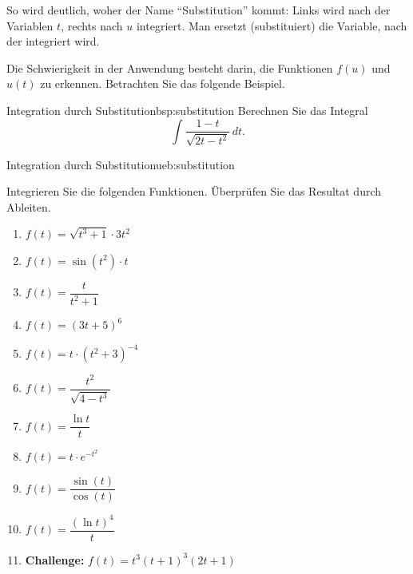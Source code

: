 So wird deutlich, woher der Name \enquote{Substitution} kommt:
Links wird nach der Variablen \(t\), rechts nach \(u\) integriert.
Man ersetzt (substituiert) die Variable, nach der integriert wird.

Die Schwierigkeit in der Anwendung besteht darin, die Funktionen
\(f(u)\) und \(u(t)\) zu erkennen.
Betrachten Sie das folgende Beispiel.

\begin{bsp}{Integration durch Substitution}{bsp:substitution}
    Berechnen Sie das Integral
    \[
        \int \frac{1-t}{\sqrt{2t-t^2}}\,dt.
    \]
\end{bsp}


\begin{ueb}{Integration durch Substitution}{ueb:substitution}

    Integrieren Sie die folgenden Funktionen.
    Überprüfen Sie das Resultat durch Ableiten.

    \begin{enumerate}[label=\alph*)]
        \item \(f(t)=\sqrt{t^3+1}\cdot 3t^2\)

        \item \(f(t)=\sin(t^2)\cdot t\)

        \item \(f(t)=\dfrac{t}{t^2+1}\)

        \item \(f(t)=(3t+5)^6\)

        \item \(f(t)=t\cdot(t^2+3)^{-4}\)

        \item \(f(t)=\dfrac{t^2}{\sqrt{4-t^3}}\)

        \item \(f(t)=\dfrac{\ln t}{t}\)

        \item \(f(t)=t\cdot e^{-t^2}\)

        \item \(f(t)=\dfrac{\sin(t)}{\cos(t)}\)

        \item \(f(t)=\dfrac{(\ln t)^4}{t}\)

        \item \textbf{Challenge:}
              \(f(t)=t^3(t+1)^3(2t+1)\)
    \end{enumerate}

\end{ueb}


















